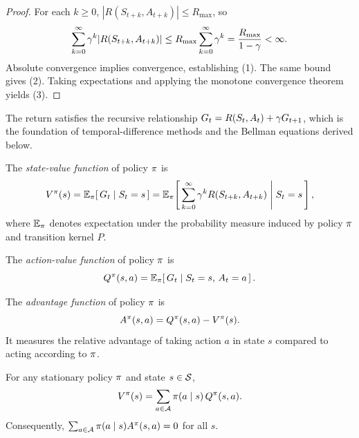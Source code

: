 \documentclass[11pt,a4paper]{article}
\begin{document}
\begin{proof}
For each $k \geq 0$, $|R(S_{t+k}, A_{t+k})| \leq R_{\max}$, so
\[
    \sum_{k=0}^{\infty} \gamma^k |R(S_{t+k}, A_{t+k})|
    \leq R_{\max} \sum_{k=0}^{\infty} \gamma^k
    = \frac{R_{\max}}{1 - \gamma} < \infty.
\]
Absolute convergence implies convergence, establishing (1). The same
bound gives (2). Taking expectations and applying the monotone
convergence theorem yields (3).
\end{proof}

\begin{remark}
\label{rem:recursive-return}
The return satisfies the recursive relationship
$G_t = R(S_t, A_t) + \gamma G_{t+1}$, which is the foundation of
temporal-difference methods and the Bellman equations derived below.
\end{remark}

\begin{definition}
\label{def:value-function}
The \emph{state-value function} of policy $\pi$ is
\[
    V^{\pi}(s) = \mathbb{E}_\pi\!\left[\, G_t \mid S_t = s \,\right]
    = \mathbb{E}_\pi\!\left[\,
    \sum_{k=0}^{\infty} \gamma^k R(S_{t+k}, A_{t+k})
    \;\middle|\; S_t = s \,\right],
\]
where $\mathbb{E}_\pi$ denotes expectation under the probability measure
induced by policy $\pi$ and transition kernel $P$.
\end{definition}

\begin{definition}
\label{def:action-value}
The \emph{action-value function} of policy $\pi$ is
\[
    Q^{\pi}(s,a) = \mathbb{E}_\pi\!\left[\, G_t \mid S_t = s,\, A_t = a
    \,\right].
\]
\end{definition}

\begin{definition}
\label{def:advantage}
The \emph{advantage function} of policy $\pi$ is
\[
    A^\pi(s,a) = Q^{\pi}(s,a) - V^{\pi}(s).
\]
It measures the relative advantage of taking action $a$ in state $s$
compared to acting according to $\pi$.
\end{definition}

\begin{proposition}
\label{prop:v-q-relation}
For any stationary policy $\pi$ and state $s \in \mathcal{S}$,
\[
    V^{\pi}(s) = \sum_{a \in \mathcal{A}} \pi(a \mid s)\, Q^{\pi}(s,a).
\]
Consequently, $\sum_{a \in \mathcal{A}} \pi(a \mid s) A^\pi(s,a) = 0$
for all $s$.
\end{proposition}
\end{document}
